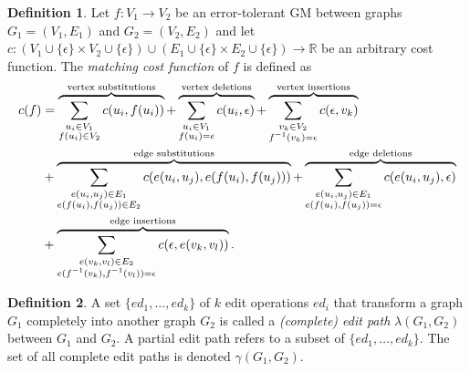 \documentclass{article}
\theoremstyle{definition}
\newtheorem{definition}{Definition}
\begin{document}
\begin{definition}
  Let $f: V_1 \to V_2$ be an error-tolerant GM between graphs $G_1 = (V_1, E_1)$ and $G_2 = (V_2, E_2)$ and let $c: (V_1 \cup \{ \epsilon \} \times V_2 \cup \{ \epsilon \}) \cup (E_1 \cup \{ \epsilon \} \times E_2 \cup \{ \epsilon \}) \to \mathbb{R}$ be an arbitrary cost function. The \emph{matching cost function} of $f$ is defined as
  \[
  \begin{aligned}
    c(f) &= \overbrace{\sum_{\substack{u_i \in V_1\\ f(u_i) \in V_2}} c(u_i, f(u_i))}^{\mathclap{\text{vertex substitutions}}} + \overbrace{\sum_{\substack{u_i \in V_1\\ f(u_i) = \epsilon}} c(u_i, \epsilon)}^{\mathclap{\text{vertex deletions}}} + \overbrace{\sum_{\substack{v_k \in V_2\\ f^{-1}(v_k) = \epsilon}} c(\epsilon, v_k)}^{\mathclap{\text{vertex insertions}}} \\
    &+ \overbrace{\sum_{\substack{e(u_i, u_j) \in E_1\\ e(f(u_i), f(u_j)) \in E_2}} c(e(u_i, u_j), e(f(u_i), f(u_j)))}^{\mathclap{\text{edge substitutions}}} + \overbrace{\sum_{\substack{e(u_i, u_j) \in E_1\\ e(f(u_i), f(u_j)) = \epsilon}} c(e(u_i, u_j), \epsilon)}^{\mathclap{\text{edge deletions}}} \\
    &+ \overbrace{\sum_{\substack{e(v_k, v_l) \in E_2\\ e(f^{-1}(v_k), f^{-1}(v_l)) = \epsilon}} c(\epsilon, e(v_k, v_l))}^{\mathclap{\text{edge insertions}}}.
  \end{aligned}
  \]
\end{definition}
\begin{definition}
  A set $\{ ed_1, \dots, ed_k \}$ of $k$ edit operations $ed_i$ that transform a graph $G_1$ completely into another graph $G_2$ is called a \emph{(complete) edit path} $\lambda(G_1, G_2)$ between $G_1$ and $G_2$. A partial edit path refers to a subset of $\{ ed_1, \dots, ed_k \}$. The set of all complete edit paths is denoted $\gamma(G_1, G_2)$.
\end{definition}
\end{document}

